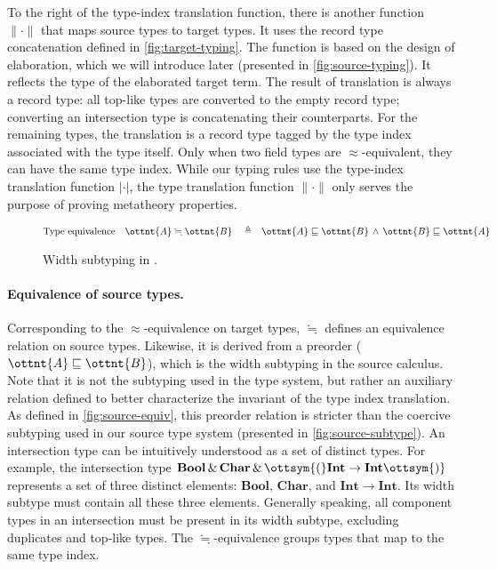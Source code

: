 To the right of the type-index translation function, there is another function
$\| \cdot \|$ that maps source types to target types. It uses the record type
concatenation defined in \autoref{fig:target-typing}. The function is based on
the design of elaboration, which we will introduce later (presented in
\autoref{fig:source-typing}). It reflects the type of the elaborated target
term. The result of translation is always a record type: all top-like types are
converted to the empty record type; converting an intersection type is
concatenating their counterparts. For the remaining types, the translation is a
record type tagged by the type index associated with the type itself. Only when
two field types are $ \approx $-equivalent, they can have the same type index.
While our typing rules use the type-index translation function  $| \cdot |$, the
type translation function $\| \cdot \|$ only serves the purpose of proving
metatheory properties.

\begin{figure}
  \small
  \begin{align*}
    &\text{Type equivalence} &\ottnt{A}  \fallingdotseq  \ottnt{B} \quad\triangleq\quad&  \ottnt{A}  \sqsubseteq  \ottnt{B}  \,\land\,  \ottnt{B}  \sqsubseteq  \ottnt{A}  \\
  \end{align*}
  \ottdefnsRSubtyping
  \caption{Width subtyping in \lambdaiplus.}\label{fig:source-equiv}
\end{figure}

\paragraph{Equivalence of source types.}
Corresponding to the $ \approx $-equivalence on target types, $ \fallingdotseq $ defines an
equivalence relation on source types. Likewise, it is derived from a preorder
($ \ottnt{A}  \sqsubseteq  \ottnt{B} $), which is the width subtyping in the source calculus. Note that
it is not the subtyping used in the type system, but rather an auxiliary
relation defined to better characterize the invariant of the type index
translation. As defined in \autoref{fig:source-equiv}, this preorder relation is
stricter than the coercive subtyping used in our source type system (presented
in \autoref{fig:source-subtype}). An intersection type can be intuitively
understood as a set of distinct types. For example, the intersection type
$ \mathbf{Bool}   \, {\&} \,   \mathbf{Char}   \, {\&} \,  \ottsym{(}   \mathbf{Int}   \rightarrow   \mathbf{Int}   \ottsym{)}$ represents a set of three distinct elements:
$ \mathbf{Bool} $, $ \mathbf{Char} $, and $ \mathbf{Int}   \rightarrow   \mathbf{Int} $. Its width subtype must contain all
these three elements. Generally speaking, all component types in an intersection
must be present in its width subtype, excluding duplicates and top-like types.
The $ \fallingdotseq $-equivalence groups types that map to the same type index.

